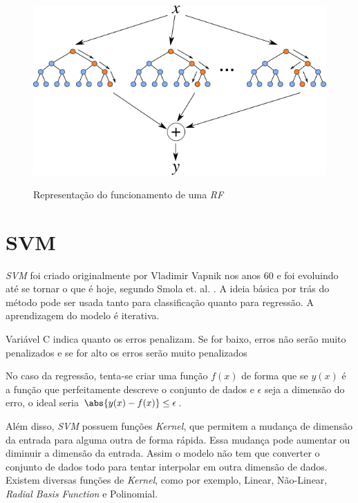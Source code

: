 \begin{figure}[htbp]
    \centering
    \includegraphics[scale=1.0]{monography/img/models/random_forest.png}
    \label{figure:random_forest}
    \caption[Representação do funcionamento de uma \textit{\acrshort{RF}}]{Representação do funcionamento de uma \textit{\acrshort{RF}}\footnotemark}
\end{figure}


\section{\acrfull{SVM}}

\textit{\acrshort{SVM}} foi criado originalmente por Vladimir Vapnik nos anos 60 e foi evoluindo até se tornar o que é hoje, segundo Smola et. al. \cite{Smola03atutorial}. A ideia básica por trás do método pode ser usada tanto para classificação quanto para regressão. A aprendizagem do modelo é iterativa.

Variável C indica quanto os erros penalizam. Se for baixo, erros não serão muito penalizados e se for alto os erros serão muito penalizados

No caso da regressão, tenta-se criar uma função \(f(x)\) de forma que se \(y(x)\) é a função que perfeitamente descreve o conjunto de dados e \(\epsilon\) seja a dimensão do erro, o ideal seria \(\abs{y(x) - f(x)} \leq \epsilon \).

Além disso, \textit{\acrshort{SVM}} possuem funções \textit{Kernel}, que permitem a mudança de dimensão da entrada para alguma outra de forma rápida. Essa mudança pode aumentar ou diminuir a dimensão da entrada. Assim o modelo não tem que converter o conjunto de dados todo para tentar interpolar em outra dimensão de dados. Existem diversas funções de \textit{Kernel}, como por exemplo, Linear, Não-Linear, \textit{Radial Basis Function} e Polinomial.


